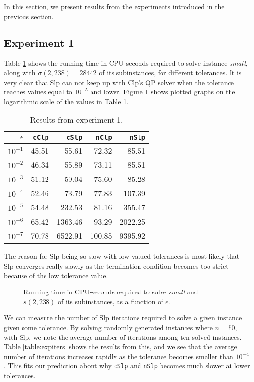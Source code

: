 In this section, we present results from the experiments introduced in the
previous section.

\subsection*{Experiment 1}
Table \ref{table:expone} shows the running time in CPU-seconds required
to solve instance \textit{small}, along with $\sigma(2, 238) = 28442$ of its
subinstances, for different tolerances.
It is very clear that Slp can not
keep up with Clp's QP solver when the tolerance reaches values equal to
$10^{-5}$ and lower.
Figure \ref{fig:smalltolerance} shows plotted graphs on the logarithmic scale
of the values in Table \ref{table:expone}.

\begin{table}[ht!]
\centering
\caption{Results from experiment 1.}
\begin{tabular}{rrrrr}
$\epsilon$ & \texttt{cClp} & \texttt{cSlp} & \texttt{nClp} & \texttt{nSlp} \\ \hline
$10^{-1}$ & 45.51 & 55.61 & 72.32 & 85.51 \\
$10^{-2}$ & 46.34 & 55.89 & 73.11 & 85.51 \\
$10^{-3}$ & 51.12 & 59.04 & 75.60 & 85.28 \\
$10^{-4}$ & 52.46 & 73.79 & 77.83 & 107.39 \\
$10^{-5}$ & 54.48 & 232.53 & 81.16 & 355.47 \\
$10^{-6}$ & 65.42 & 1363.46 & 93.29 & 2022.25 \\
$10^{-7}$ & 70.78 & 6522.91 & 100.85 & 9395.92
\end{tabular}
\label{table:expone}
\end{table}

The reason for Slp being so slow with low-valued tolerances is most likely that
Slp converges really slowly as the termination condition becomes too strict
because of the low tolerance value.
\begin{figure}[ht!]
    \centering
    
    \caption{Running time in CPU-seconds required to solve \textit{small}
             and $s(2, 238)$ of its subinstances, as a function of $\epsilon$.}
    \label{fig:smalltolerance}
\end{figure}
We can measure the number of Slp iterations required to solve a given instance
given some tolerance. By solving randomly generated instances where $n = 50$,
with Slp, we note the average number of iterations among ten solved
instances. Table \ref{table:expiters} shows the results from this, and we see
that the average number of iterations increases rapidly as the tolerance
becomes smaller than $10^{-4}$. This fits our prediction about why
\texttt{cSlp} and \texttt{nSlp} becomes much slower at lower tolerances.

